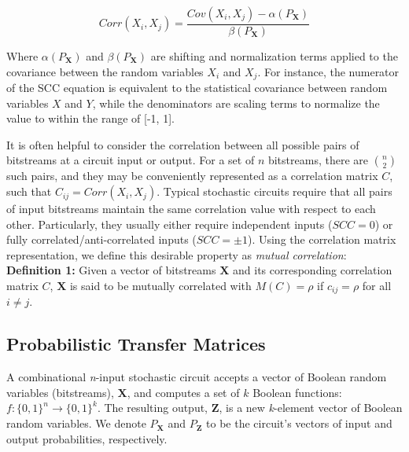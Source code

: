 \documentclass[conference]{IEEEtran}
\begin{document}
\begin{equation}
    Corr(X_i, X_j) = \frac{Cov(X_i, X_j) - \alpha(P_{\mathbf{X}})}{\beta(P_{\mathbf{X}})}
\end{equation}

Where $\alpha(P_{\mathbf{X}})$ and $\beta(P_{\mathbf{X}})$ are shifting and normalization terms applied to the covariance between the random variables $X_i$ and $X_j$. For instance, the numerator of the SCC equation is equivalent to the statistical covariance between random variables $X$ and $Y$, while the denominators are scaling terms to normalize the value to within the range of [-1, 1].

It is often helpful to consider the correlation between all possible pairs of bitstreams at a circuit input or output. For a set of $n$ bitstreams, there are $n \choose 2$ such pairs, and they may be conveniently represented as a correlation matrix $C$, such that $C_{ij} = Corr(X_i, X_j)$. Typical stochastic circuits require that all pairs of input bitstreams maintain the same correlation value with respect to each other. Particularly, they usually either require independent inputs ($SCC = 0$) or fully correlated/anti-correlated inputs ($SCC = \pm 1$). Using the correlation matrix representation, we define this desirable property as \textit{mutual correlation}: \\

\textbf{Definition 1:} Given a vector of bitstreams $\textbf{X}$ and its corresponding correlation matrix $C$, $\textbf{X}$ is said to be mutually correlated with $M(C) = \rho$ if $c_{ij}=\rho$ for all $i\neq j$. 

\subsection{Probabilistic Transfer Matrices}
A combinational \textit{n}-input stochastic circuit accepts a vector of Boolean random variables (bitstreams), $\textbf{X}$, and computes a set of $k$ Boolean functions: $f:\{0,1\}^n\rightarrow{\{0,1\}}^k$. The resulting output, $\textbf{Z}$, is a new \textit{k}-element vector of Boolean random variables. We denote $P_{\mathbf{X}}$ and $P_{\mathbf{Z}}$ to be the circuit's vectors of input and output probabilities, respectively.
\end{document}

